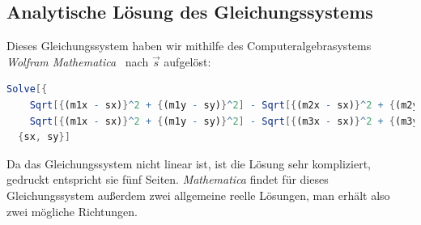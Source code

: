 \subsection{Analytische Lösung des Gleichungssystems}
Dieses Gleichungssystem haben wir mithilfe des Computeralgebrasystems \textit{Wolfram Mathematica}~\cite{mathematica} nach $\vec{s}$ aufgelöst:
\begin{lstlisting}[language=Mathematica,caption={Befehl für das Lösen des Gleichungssystem in \textit{Mathematica}.}]
  Solve[{
    Sqrt[{(m1x - sx)}^2 + {(m1y - sy)}^2] - Sqrt[{(m2x - sx)}^2 + {(m2y - sy)}^2] = dx12,
    Sqrt[{(m1x - sx)}^2 + {(m1y - sy)}^2] - Sqrt[{(m3x - sx)}^2 + {(m3y - sy)}^2] = dx13},
  {sx, sy}]
\end{lstlisting}
Da das Gleichungssystem nicht linear ist, ist die Lösung sehr kompliziert, gedruckt entspricht sie fünf Seiten. \textit{Mathematica} findet für dieses Gleichungssystem außerdem zwei allgemeine reelle Lösungen, man erhält also zwei mögliche Richtungen.
